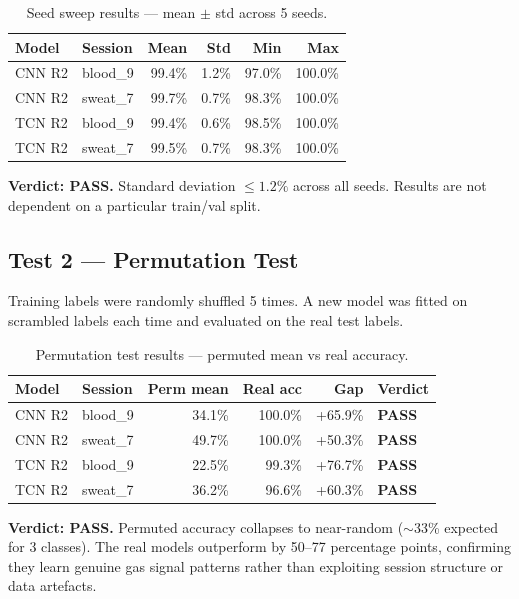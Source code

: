 \documentclass[11pt, a4paper]{article}
\newcommand{\pass}{\textcolor{green!60!black}{\textbf{PASS}}}
\begin{document}
\begin{table}[H]
\centering
\caption{Seed sweep results — mean $\pm$ std across 5 seeds.}
\begin{tabular}{llrrrr}
\toprule
\textbf{Model} & \textbf{Session} & \textbf{Mean} & \textbf{Std} & \textbf{Min} & \textbf{Max} \\
\midrule
CNN R2 & blood\_9 & 99.4\% & 1.2\% & 97.0\% & 100.0\% \\
CNN R2 & sweat\_7 & 99.7\% & 0.7\% & 98.3\% & 100.0\% \\
TCN R2 & blood\_9 & 99.4\% & 0.6\% & 98.5\% & 100.0\% \\
TCN R2 & sweat\_7 & 99.5\% & 0.7\% & 98.3\% & 100.0\% \\
\bottomrule
\end{tabular}
\end{table}

\textbf{Verdict: \pass.} Standard deviation $\leq 1.2\%$ across all seeds.
Results are not dependent on a particular train/val split.

\subsection{Test 2 — Permutation Test}

Training labels were randomly shuffled 5 times. A new model was fitted on
scrambled labels each time and evaluated on the real test labels.

\begin{table}[H]
\centering
\caption{Permutation test results — permuted mean vs real accuracy.}
\begin{tabular}{llrrrl}
\toprule
\textbf{Model} & \textbf{Session} & \textbf{Perm mean} & \textbf{Real acc} & \textbf{Gap} & \textbf{Verdict} \\
\midrule
CNN R2 & blood\_9 & 34.1\% & 100.0\% & +65.9\% & \pass \\
CNN R2 & sweat\_7 & 49.7\% & 100.0\% & +50.3\% & \pass \\
TCN R2 & blood\_9 & 22.5\% &  99.3\% & +76.7\% & \pass \\
TCN R2 & sweat\_7 & 36.2\% &  96.6\% & +60.3\% & \pass \\
\bottomrule
\end{tabular}
\end{table}

\textbf{Verdict: \pass.} Permuted accuracy collapses to near-random ($\sim$33\%
expected for 3 classes). The real models outperform by 50–77 percentage points,
confirming they learn genuine gas signal patterns rather than exploiting
session structure or data artefacts.
\end{document}
